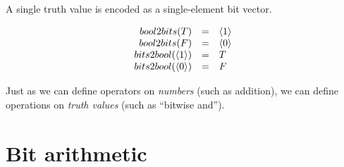 \begin{definition}

  A single truth value is encoded as a single-element bit vector.

  \[
    \begin{array}{rcl}
      bool2bits(T) & = & \langle 1 \rangle \\
      bool2bits(F) & = & \langle 0 \rangle \\
      bits2bool(\langle 1 \rangle) & = & T \\
      bits2bool(\langle 0 \rangle) & = & F \\
    \end{array}
  \]
\end{definition}

Just as we can define operators on \emph{numbers} (such as addition),
we can define operations on \emph{truth values} (such as ``bitwise
and'').

\newcommand\bitand{\&}
\newcommand\bitor{\|}
\newcommand\bitxor{\oplus}

\section{Bit arithmetic}
\label{sec:bit-arithmetic}

